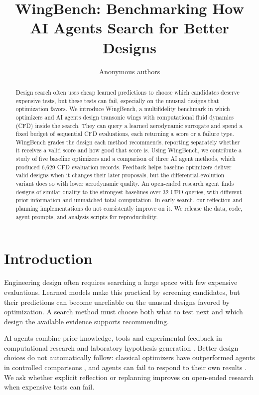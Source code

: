 \documentclass{article} %
\title{WingBench: Benchmarking How AI Agents Search for Better Designs}
\author{Anonymous authors}
\newcommand{\UnifiedCFDObserved}{6{,}629}
\begin{document}
\maketitle

\begin{abstract}
Design search often uses cheap learned predictions to choose which candidates
deserve expensive tests, but these tests can fail, especially on the unusual
designs that optimization favors. We introduce WingBench, a multifidelity
benchmark in which optimizers and AI agents design transonic wings with
computational fluid dynamics (CFD) inside the search. They can query a learned
aerodynamic surrogate and spend a fixed budget of sequential CFD evaluations,
each returning a score or a failure type. WingBench grades the design each
method recommends, reporting separately whether it receives a valid score and
how good that score is. Using WingBench, we contribute a study of five baseline
optimizers and a comparison of three AI agent methods, which
produced \UnifiedCFDObserved{} CFD evaluation records. Feedback helps
baseline optimizers deliver valid designs when it changes their later proposals,
but the differential-evolution variant does so with lower aerodynamic quality.
An open-ended research agent finds designs of similar quality to the strongest
baselines over 32 CFD queries, with different prior information and unmatched
total computation. In early search, our reflection and planning implementations
do not consistently improve on it. We release the data, code,
agent prompts, and analysis scripts for reproducibility.
\end{abstract}

\section{Introduction}

Engineering design often requires searching a large space with few expensive
evaluations. Learned models make this practical by screening candidates, but
their predictions can become unreliable on the unusual designs favored by
optimization. A search method must choose both what to test next and which
design the available evidence supports recommending.

AI agents combine prior knowledge, tools and experimental feedback in
computational research \citep{lu2026aiscientist} and laboratory hypothesis
generation \citep{swanson2025virtuallab,gottweis2026coscientist}. Better design
choices do not automatically follow: classical optimizers have outperformed
agents in controlled comparisons \citep{ferreira2026autoresearch}, and agents
can fail to respond to their own results \citep{gupta2025llmbo}. We ask whether
explicit reflection \citep{shinn2023reflexion} or replanning
\citep{liu2024rafa} improves on open-ended research when expensive tests can fail.
\end{document}
